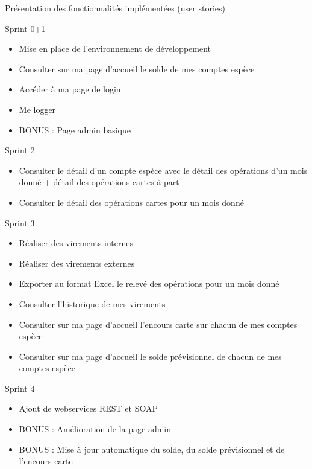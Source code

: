 \begin{frame}
	\begin{center}
		\huge{Pr\'esentation des fonctionnalit\'es impl\'ement\'ees (user stories) }
	\end{center}
\end{frame}

\begin{frame}{Sprint 0+1}
\begin{itemize}
	\item Mise en place de l'environnement de d\'eveloppement
	\item Consulter sur ma page d'accueil le solde de mes comptes esp\`ece
	\item Acc\'eder \`a ma page de login
	\item Me logger
	\item BONUS : Page admin basique
\end{itemize}
\end{frame}

\begin{frame}{Sprint 2}
\begin{itemize}
	\item Consulter le d\'etail d'un compte esp\`ece avec le d\'etail des op\'erations d'un mois donn\'e + d\'etail des op\'erations cartes \`a part
	\item Consulter le d\'etail des op\'erations cartes pour un mois donn\'e
\end{itemize}
\end{frame}

\begin{frame}{Sprint 3}
\begin{itemize}
	\item R\'ealiser des virements internes
	\item R\'ealiser des virements externes
	\item Exporter au format Excel le relev\'e des op\'erations pour un mois donn\'e
	\item Consulter l'historique de mes virements
	\item Consulter sur ma page d'accueil l'encours carte sur chacun de mes comptes esp\`ece
	\item Consulter sur ma page d'accueil le solde pr\'evisionnel de chacun de mes comptes esp\`ece
\end{itemize}
\end{frame}

\begin{frame}{Sprint 4}
\begin{itemize}
	\item Ajout de webservices REST et SOAP
	\item BONUS : Am\'elioration de la page admin
	\item BONUS : Mise \`a jour automatique du solde, du solde pr\'evisionnel et de l'encours carte 
\end{itemize}
\end{frame}

